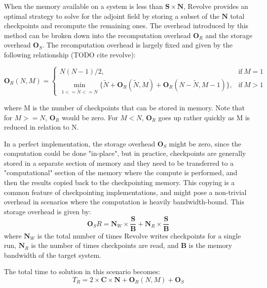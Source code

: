 \documentclass[conference]{IEEEtran}
\begin{document}
When the memory available on a system is less than $\mathbf{S} \times \mathbf{N}$, Revolve provides
an optimal strategy to solve for the adjoint field by storing a subset of the $\mathbf{N}$ total checkpoints
and recompute the remaining ones. The overhead introduced by this method can be broken down into
the recomputation overhead $\mathbf{O}_R$ and the storage overhead $\mathbf{O}_S$. The recomputation
overhead is largely fixed and given by the following relationship (TODO cite revolve):
\begin{strip}
\begin{equation}
\mathbf{O}_R(N, M) = \begin{cases}
      N(N-1) /2, & \text{if}\ M=1 \\
      \min\limits_{1<=\widetilde{N}<=N} \{\widetilde{N} + \mathbf{O}_R(\widetilde{N}, M) + \mathbf{O}_R(N-\widetilde{N}, M-1)\}, & \text{if}\ M>1
    \end{cases}
    \label{eqn:recompute}
\end{equation}
\end{strip}
where M is the number of checkpoints that can be stored in memory. Note that for $M >=N$, $\mathbf{O}_R$
would be zero. For $M < N$, $\mathbf{O}_R$ goes up rather quickly as M is reduced in relation to N. 

In a perfect implementation, the storage overhead $\mathbf{O}_S$ might be zero, since the computation could
be done "in-place", but in practice, checkpoints are generally stored in a separate section of memory and they
need to be transferred to a "computational" section of the memory where the compute is performed, and then
the results copied back to the checkpointing memory. This copying is a common feature of checkpointing
implementations, and might pose a non-trivial overhead in scenarios where the computation is heavily bandwidth-bound. 
This storage overhead is given by:
\begin{equation}
\mathbf{O}_SR = \mathbf{N}_W \times \frac{\mathbf{S}}{\mathbf{B}} + \mathbf{N}_R \times \frac{\mathbf{S}}{\mathbf{B}}
\label{eqn:storage}
\end{equation}
where $\mathbf{N}_W$ is the total number of times Revolve writes checkpoints for a single run, $ \mathbf{N}_R$ 
is the number of times checkpoints are read, and $\mathbf{B}$ is the memory bandwidth of the target system. 

The total time to solution in this scenario becomes:
\begin{equation}
T_R = 2 \times \mathbf{C} \times \mathbf{N} + \mathbf{O}_R(N, M) + \mathbf{O}_S
\end{equation}
\end{document}

